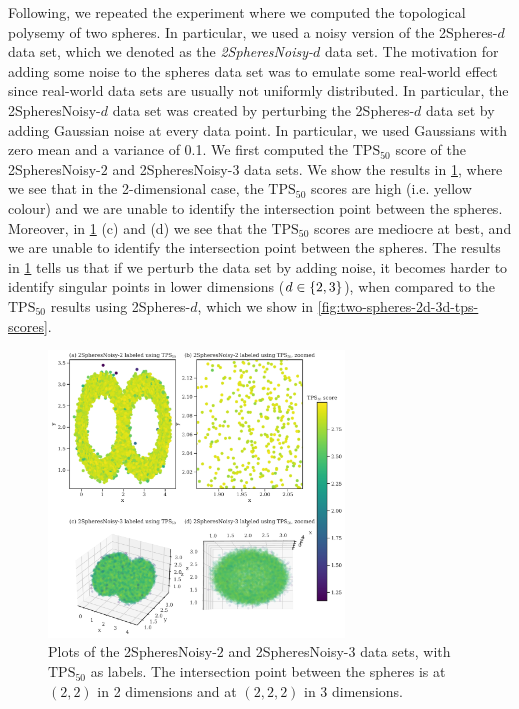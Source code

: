 Following, we repeated the experiment where we computed the topological polysemy of two spheres. In particular, we used a noisy version of the 2Spheres-$d$ data set, which we denoted as the \textit{2SpheresNoisy-$d$} data set. The motivation for adding some noise to the spheres data set was to emulate some real-world effect since real-world data sets are usually not uniformly distributed. In particular, the 2SpheresNoisy-$d$ data set was created by perturbing the 2Spheres-$d$ data set by adding Gaussian noise at every data point. In particular, we used Gaussians with zero mean and a variance of 0.1. We first computed the $\text{TPS}_{50}$ score of the 2SpheresNoisy-$2$ and 2SpheresNoisy-$3$ data sets. We show the results in \cref{fig:two-spheres-noisy-2d-3d-tps-scores}, where we see that in the 2-dimensional case, the $\text{TPS}_{50}$ scores are high (i.e. yellow colour) and we are unable to identify the intersection point between the spheres. Moreover, in \cref{fig:two-spheres-noisy-2d-3d-tps-scores} (c) and (d) we see that the $\text{TPS}_{50}$ scores are mediocre at best, and we are unable to identify the intersection point between the spheres. The results in \cref{fig:two-spheres-noisy-2d-3d-tps-scores} tells us that if we perturb the data set by adding noise, it becomes harder to identify singular points in lower dimensions ($d \in \left\{2, 3\right\}$), when compared to the $\text{TPS}_{50}$ results using 2Spheres-$d$, which we show in \cref{fig:two-spheres-2d-3d-tps-scores}.
\begin{figure}[H]
    \centering
    \includegraphics[width=0.7\textwidth]{thesis/figures/two-spheres-noisy-2d-3d-tps-scores.pdf}
    \caption{Plots of the 2SpheresNoisy-$2$ and 2SpheresNoisy-$3$ data sets, with $\text{TPS}_{50}$ as labels. The intersection point between the spheres is at $(2, 2)$ in 2 dimensions and at $(2, 2, 2)$ in 3 dimensions.}
    \label{fig:two-spheres-noisy-2d-3d-tps-scores}
\end{figure}

